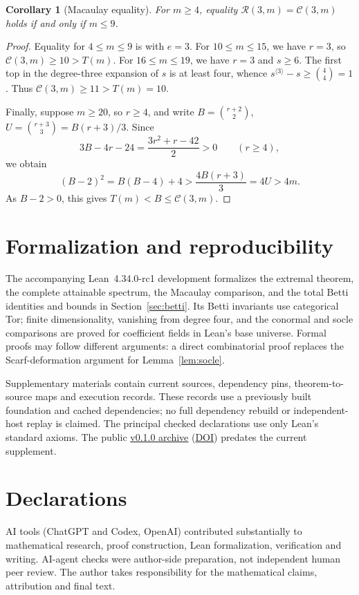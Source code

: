 \documentclass[11pt]{article}
\newtheorem{corollary}[theorem]{Corollary}
\begin{document}
\medskip
\begin{corollary}[Macaulay equality]\label{cor:macaulay}
For \(m\ge4\), equality \(\mathcal R(3,m)=\mathcal C(3,m)\) holds
if and only if \(m\le9\).\end{corollary}

\begin{proof}
Equality for \(4\le m\le9\) is \cite[Theorem~3.3]{MS25} with
\(e=3\). For \(10\le m\le15\), we have \(r=3\), so
\(\mathcal C(3,m)\ge10>T(m)\). For \(16\le m\le19\), we have
\(r=3\) and \(s\ge6\). The first top in the degree-three expansion
of \(s\) is at least four, whence
\(s^{\langle3\rangle}-s\ge\binom44=1\). Thus
\(\mathcal C(3,m)\ge11>T(m)=10\).

Finally, suppose \(m\ge20\), so \(r\ge4\), and write
\(B=\binom{r+2}{2}\), \(U=\binom{r+3}{3}=B(r+3)/3\).
Since
\[
3B-4r-24=\frac{3r^2+r-42}{2}>0 \qquad(r\ge4),
\]
we obtain
\[
(B-2)^2=B(B-4)+4>
\frac{4B(r+3)}3=4U>4m.
\]
As \(B-2>0\), this gives \(T(m)<B\le\mathcal C(3,m)\).
\end{proof}

\section*{Formalization and reproducibility}
The accompanying Lean~4.34.0-rc1 development formalizes the extremal
theorem, the complete attainable spectrum, the Macaulay comparison,
and the total Betti identities and bounds in Section~\ref{sec:betti}.
Its Betti invariants use categorical Tor; finite dimensionality,
vanishing from degree four, and the conormal and socle comparisons
are proved for coefficient fields in Lean's base universe.
Formal proofs may follow different arguments: a direct combinatorial
proof replaces the Scarf-deformation argument for Lemma~\ref{lem:socle}.

Supplementary materials contain current sources, dependency pins,
theorem-to-source maps and execution records. These records use a
previously built foundation and cached dependencies; no full dependency
rebuild or independent-host replay is claimed. The principal checked
declarations use only Lean's standard axioms.
The public
\href{https://github.com/stksk310/NS-P3-Lean/releases/tag/v0.1.0}{v0.1.0 archive}
(\href{https://doi.org/10.5281/zenodo.23549534}{DOI}) predates the current supplement.

\section*{Declarations}
AI tools (ChatGPT and Codex, OpenAI) contributed substantially to
mathematical research, proof construction, Lean formalization,
verification and writing. AI-agent checks were author-side preparation,
not independent human peer review. The author takes responsibility for the mathematical claims, attribution
and final text.
\end{document}
